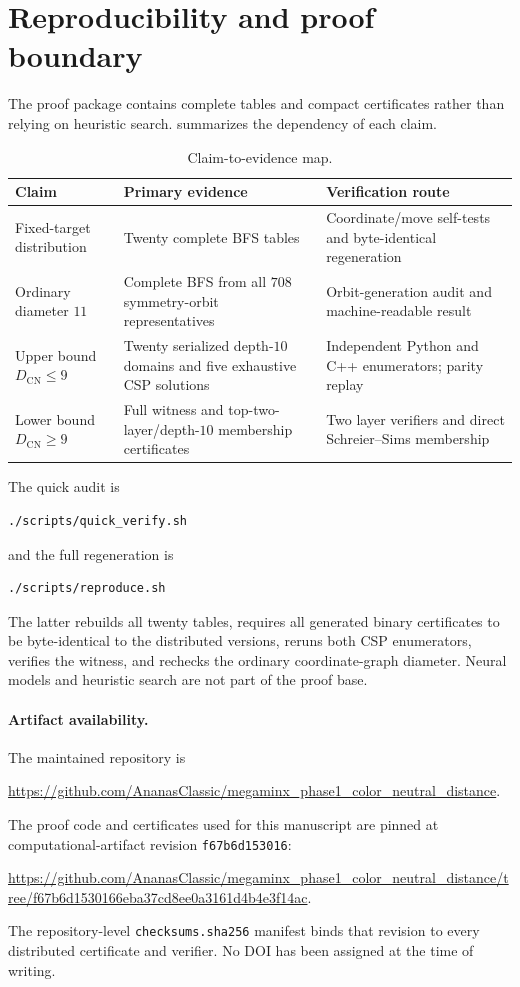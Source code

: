 \documentclass[11pt]{article}
\theoremstyle{definition}
\newcommand{\DCN}{D_{\mathrm{CN}}}
\newcommand{\ArtifactCommit}{\texttt{f67b6d153016}}
\begin{document}
\section{Reproducibility and proof boundary}

The proof package contains complete tables and compact certificates rather than relying on heuristic search.   summarizes the dependency of each claim.

\begin{table}[ht]
\centering
\caption{Claim-to-evidence map.}
\label{tab:evidence}
\small
\begin{tabularx}{\textwidth}{@{}p{}X p{}@{}}
\toprule
Claim & Primary evidence & Verification route\\
\midrule
Fixed-target distribution & Twenty complete BFS tables & Coordinate/move self-tests and byte-identical regeneration\\
Ordinary diameter $11$ & Complete BFS from all $708$ symmetry-orbit representatives & Orbit-generation audit and machine-readable result\\
Upper bound $\DCN\le9$ & Twenty serialized depth-$10$ domains and five exhaustive CSP solutions & Independent Python and C++ enumerators; parity replay\\
Lower bound $\DCN\ge9$ & Full witness and top-two-layer/depth-$10$ membership certificates & Two layer verifiers and direct Schreier--Sims membership\\
\bottomrule
\end{tabularx}
\end{table}

The quick audit is
\begin{lstlisting}
./scripts/quick_verify.sh
\end{lstlisting}
and the full regeneration is
\begin{lstlisting}
./scripts/reproduce.sh
\end{lstlisting}
The latter rebuilds all twenty tables, requires all generated binary certificates to be byte-identical to the distributed versions, reruns both CSP enumerators, verifies the witness, and rechecks the ordinary coordinate-graph diameter.  Neural models and heuristic search are not part of the proof base.

\paragraph{Artifact availability.}
The maintained repository is
\begin{center}
\url{https://github.com/AnanasClassic/megaminx_phase1_color_neutral_distance}.
\end{center}
The proof code and certificates used for this manuscript are pinned at computational-artifact revision \ArtifactCommit:
\begin{center}
\url{https://github.com/AnanasClassic/megaminx_phase1_color_neutral_distance/tree/f67b6d1530166eba37cd8ee0a3161d4b4e3f14ac}.
\end{center}
The repository-level \texttt{checksums.sha256} manifest binds that revision to every distributed certificate and verifier.  No DOI has been assigned at the time of writing.
\end{document}

